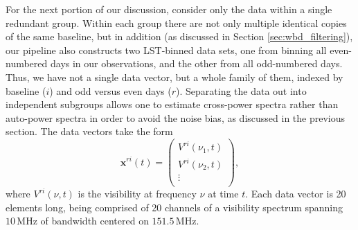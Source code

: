 \documentclass[twocolumn,numberedappendix]{emulateapj} \shorttitle{New Limits on the 21 cm Power Spectrum at $z=8.4$}
\begin{document}
For the next portion of our discussion, consider only the data within a single redundant group. Within each group there are not only multiple identical copies of the same baseline, but in addition (as discussed in
Section \ref{sec:wbd_filtering}), our pipeline also constructs two LST-binned data sets, one from binning all even-numbered days in our observations, and the other from all odd-numbered days. Thus, 
we have not a single data vector, but a whole family of them, indexed by baseline ($i$) and odd
versus even days ($r$). Separating the data out into independent subgroups allows one to estimate
cross-power spectra rather than auto-power spectra in order to avoid the noise bias, as discussed in the previous section. The data vectors take the form
\begin{equation}
\label{eqn:xvectdef}
\mathbf{x}^{ri}(t) = \left( \begin{array}{c}
V^{ri} (\nu_1, t) \\
V^{ri} (\nu_2, t) \\
\vdots \\
\end{array}
\right), 
\end{equation}
where $V^{ri} (\nu, t)$ is the visibility at frequency $\nu$ at time $t$. Each data vector is 
20 elements long, being comprised of 20 channels of a visibility spectrum spanning $10\,\textrm{MHz}$ of bandwidth centered on $151.5\,\textrm{MHz}$.
%
\end{document}
